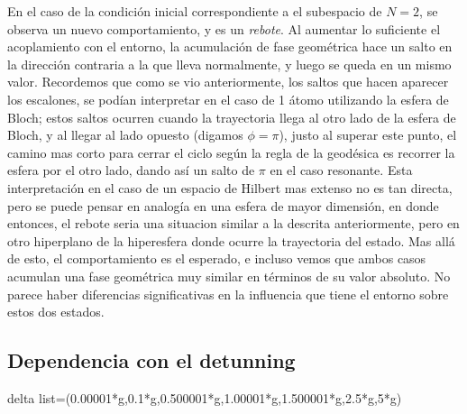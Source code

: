 En el caso de la condición inicial correspondiente a el subespacio de $N=2$, se observa un nuevo comportamiento, y es un \textit{rebote}. Al aumentar lo suficiente el acoplamiento con el entorno, la acumulación de fase geométrica hace un salto en la dirección contraria a la que lleva normalmente, y luego se queda en un mismo valor. Recordemos que como se vio anteriormente, los saltos que hacen aparecer los escalones, se podían interpretar en el caso de 1 átomo utilizando la esfera de Bloch; estos saltos ocurren cuando la trayectoria llega al otro lado de la esfera de Bloch, y al llegar al lado opuesto (digamos $\phi=\pi$), justo al superar este punto, el camino mas corto para cerrar el ciclo según la regla de la geodésica es recorrer la esfera por el otro lado, dando así un salto de $\pi$ en el caso resonante. Esta interpretación en el caso de un espacio de Hilbert mas extenso no es tan directa, pero se puede pensar en analogía en una esfera de mayor dimensión, en donde entonces, el rebote seria una situacion similar a la descrita anteriormente, pero en otro hiperplano de la hiperesfera donde ocurre la trayectoria del estado. Mas allá de esto, el comportamiento es el esperado, e incluso vemos que ambos casos acumulan una fase geométrica muy similar en términos de su valor absoluto. No parece haber diferencias significativas en la influencia que tiene el entorno sobre estos dos estados.
\subsection{Dependencia con el detunning}
delta list=(0.00001*g,0.1*g,0.500001*g,1.00001*g,1.500001*g,2.5*g,5*g)

